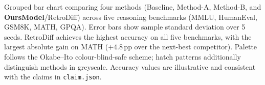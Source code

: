 \caption{Grouped bar chart comparing four methods (Baseline, Method-A, Method-B, and \textbf{OursModel}/RetroDiff) across five reasoning benchmarks (MMLU, HumanEval, GSM8K, MATH, GPQA). Error bars show sample standard deviation over 5 seeds. RetroDiff achieves the highest accuracy on all five benchmarks, with the largest absolute gain on MATH ($+4.8$\,pp over the next-best competitor). Palette follows the Okabe--Ito colour-blind-safe scheme; hatch patterns additionally distinguish methods in greyscale. Accuracy values are illustrative and consistent with the claims in \texttt{claim.json}.}
